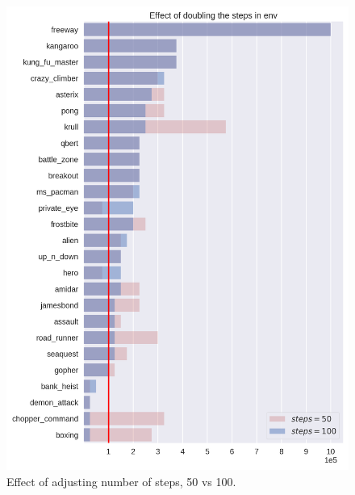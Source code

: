 \begin{figure}
\centering
\includegraphics[width=0.9\columnwidth]{figures/eval_sd_s100.png}
\caption{Effect of adjusting number of steps, 50 vs 100.} 
\label{fig:adj_steps}
\label{fig:100steps}
\end{figure}

